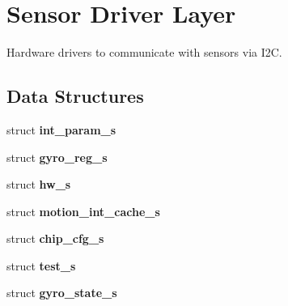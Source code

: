 \section{Sensor Driver Layer}
\label{group___d_r_i_v_e_r_s}


Hardware drivers to communicate with sensors via I2C.  


\subsection*{Data Structures}
\begin{DoxyCompactItemize}
\item 
struct \textbf{ int\+\_\+param\+\_\+s}
\item 
struct \textbf{ gyro\+\_\+reg\+\_\+s}
\item 
struct \textbf{ hw\+\_\+s}
\item 
struct \textbf{ motion\+\_\+int\+\_\+cache\+\_\+s}
\item 
struct \textbf{ chip\+\_\+cfg\+\_\+s}
\item 
struct \textbf{ test\+\_\+s}
\item 
struct \textbf{ gyro\+\_\+state\+\_\+s}
\end{DoxyCompactItemize}
